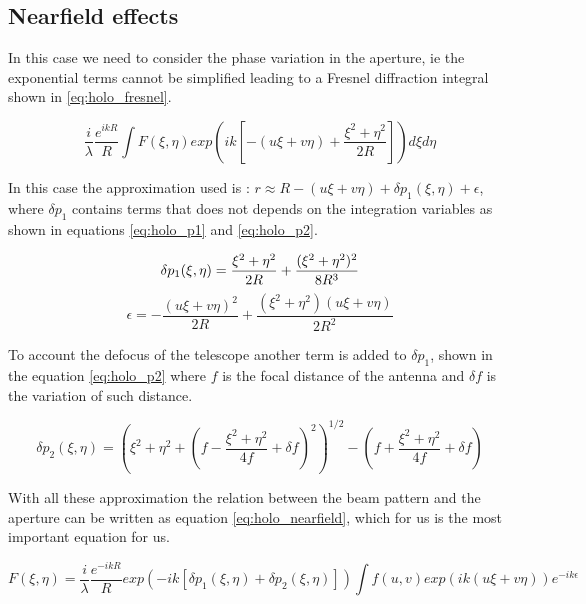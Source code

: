 \subsection{Nearfield effects}
In this case we need to consider the phase variation in the aperture, ie the exponential terms cannot be simplified leading to a Fresnel diffraction integral shown in \ref{eq:holo_fresnel}.


\begin{equation}
    \frac{i}{\lambda}\frac{e^{ikR}}{R} \int F(\xi,\eta) exp\left(ik\left[-(u\xi+v\eta)+\frac{\xi^2+\eta^2}{2R}\right]\right)d\xi d\eta
    \label{eq:holo_fresnel}
\end{equation}


 In this case the approximation used is : $r \approx R-(u\xi+v\eta)+\delta p_1(\xi,\eta)+\epsilon$, where $\delta p_1$ contains terms that does not depends on the integration variables as shown in equations \ref{eq:holo_p1} and \ref{eq:holo_p2}.

\begin{equation}
    \delta p_1(\xi,\eta) = \frac{\xi^2+\eta^2}{2R}+\frac{(\xi^2+\eta^2)^2}{8R^3} \\
    \label{eq:holo_p1}
\end{equation}
\begin{equation}
    \epsilon = -\frac{(u\xi+v\eta)^2}{2R}+\frac{(\xi^2+\eta^2)(u\xi+v\eta)}{2R^2}
    \label{eq:holo_epsilon}
\end{equation}



To account the defocus of the telescope another term is added to $\delta p_1$, shown in the equation \ref{eq:holo_p2} where $f$ is the focal distance of the antenna and $\delta f$  is the variation of such distance.

\begin{equation}
    \delta p_2(\xi, \eta) = (\xi^2+\eta^2+(f-\frac{\xi^2+\eta^2}{4f}+\delta f)^2)^{1/2} - (f+\frac{\xi^2+\eta^2}{4f}+\delta f)
    \label{eq:holo_p2}
\end{equation}



With all these approximation the relation between the beam pattern and the aperture can be written as equation \ref{eq:holo_nearfield}, which for us is the most important equation for us.


\begin{equation}
    \boxed{ F(\xi, \eta) = \frac{i}{\lambda}\frac{e^{-ikR}}{R} exp\left(-ik[\delta p_1(\xi,\eta)+\delta p_2(\xi, \eta)]\right) \int f(u,v)exp\left(ik(u\xi+v\eta)\right)e^{-ik\epsilon} }
    \label{eq:holo_nearfield}
\end{equation}


